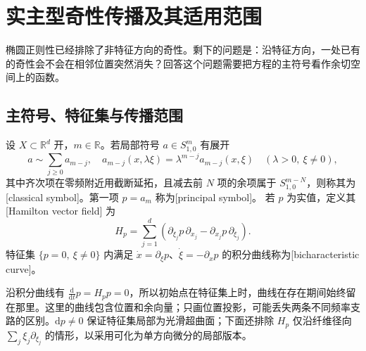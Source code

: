 \section{实主型奇性传播及其适用范围}
\label{b2:sec:app-G-6}

椭圆正则性已经排除了非特征方向的奇性。剩下的问题是：沿特征方向，一处已有的奇性会不会在相邻位置突然消失？回答这个问题需要把方程的主符号看作余切空间上的函数。

\subsection{主符号、特征集与传播范围}
\label{b2:subsec:G0601}

\begin{definition}\label{b2:def:G-principal-hamilton}
设 \(X\subset\mathbb R^d\) 开，\(m\in\mathbb R\)。若局部符号 \(a\in S^m_{1,0}\) 有展开
\[
 a\sim\sum_{j\ge0}a_{m-j},
 \quad a_{m-j}(x,\lambda\xi)=\lambda^{m-j}a_{m-j}(x,\xi)
 \quad(\lambda>0,\ \xi\ne0),
\]
其中齐次项在零频附近用截断延拓，且减去前 \(N\) 项的余项属于 \(S^{m-N}_{1,0}\)，则称其为[classical symbol]。第一项 \(p=a_m\) 称为[principal symbol]。
若 \(p\) 为实值，定义其 [Hamilton vector field] 为
\[
 H_p=\sum_{j=1}^d\left(
      \partial_{\xi_j}p\,\partial_{x_j}
      -\partial_{x_j}p\,\partial_{\xi_j}\right).
\]
特征集 \(\{p=0,\ \xi\ne0\}\) 内满足
\(\dot x=\partial_\xi p\)、\(\dot\xi=-\partial_xp\)
的积分曲线称为[bicharacteristic curve]。
\end{definition}

沿积分曲线有 \(\frac{\mathrm d}{\mathrm dt}p=H_pp=0\)，所以初始点在特征集上时，曲线在存在期间始终留在那里。这里的曲线包含位置和余向量；只画位置投影，可能丢失两条不同频率支路的区别。\(\mathrm dp\ne0\) 保证特征集局部为光滑超曲面；下面还排除 \(H_p\) 仅沿纤维径向 \(\sum_j\xi_j\partial_{\xi_j}\) 的情形，以采用可化为单方向微分的局部版本。

